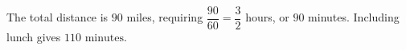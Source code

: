 The total distance is $90$ miles, requiring $\dfrac{90}{60}=\dfrac{3}{2}$ hours, or $90$ minutes. Including lunch gives $\boxed{110\text{ minutes}}$.
